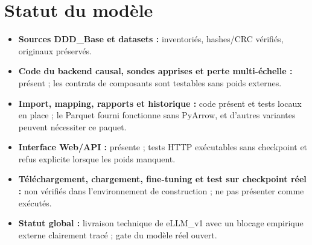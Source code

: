 \documentclass[11pt,a4paper]{article}
\begin{document}
\section{Statut du modèle}
\begin{itemize}[leftmargin=*]
\item \textbf{Sources DDD\_Base et datasets :} inventoriés, hashes/CRC vérifiés, originaux préservés.
\item \textbf{Code du backend causal, sondes apprises et perte multi-échelle :} présent ; les contrats de composants sont testables sans poids externes.
\item \textbf{Import, mapping, rapports et historique :} code présent et tests locaux en place ; le Parquet fourni fonctionne sans PyArrow, et d'autres variantes peuvent nécessiter ce paquet.
\item \textbf{Interface Web/API :} présente ; tests HTTP exécutables sans checkpoint et refus explicite lorsque les poids manquent.
\item \textbf{Téléchargement, chargement, fine-tuning et test sur checkpoint réel :} non vérifiés dans l'environnement de construction ; ne pas présenter comme exécutés.
\item \textbf{Statut global :} livraison technique de eLLM\_v1 avec un blocage empirique externe clairement tracé ; gate du modèle réel ouvert.
\end{itemize}
\end{document}
